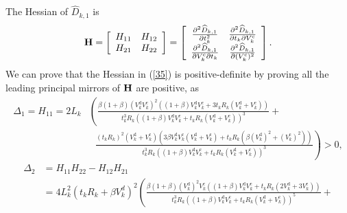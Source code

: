 \documentclass[journal,draftcls,onecolumn,12pt,twoside]{IEEEtran}
\begin{document}
\begin{appendices}
The Hessian of $\widehat{D}_{k,1}$ is
\begin{equation}
    \bf{H}=
    \left[
        \begin{array}{c c}
            H_{11}	&H_{12}\\
            H_{21}	&H_{22}
        \end{array}
    \right]=
    \left[
        \begin{array}{c c}
        \frac{\partial^2  \widehat{D}_{k,1}}{\partial t_k^2}	                    &\frac{\partial^2  \widehat{D}_{k,1}}{\partial t_k\partial V_k^{\text{c}}}\\
        \frac{\partial^2  \widehat{D}_{k,1}}{\partial V_k^{\text{c}} \partial t_k}	&\frac{\partial^2  \widehat{D}_{k,1}}{\partial(V_k^{\text{c}})^2}
        \end{array}
    \right]. \label{35}
\end{equation}
We can prove that the Hessian in (\ref{35}) is positive-definite by proving all the leading principal mirrors of $\bf{H}$ are positive, as
\begin{equation}
    \begin{aligned}
	\Delta_1=H_{11} = 2L_k
    & \left( \frac{ \beta (1+\beta)\left(V_k^{\text{d}} V_k^{\text{c}}\right)^2 \left( (1+\beta) V_k^{\text{d}} V_k^{\text{c}} + 3 t_k R_k \left( V_k^{\text{d}}+V_k^{\text{c}}
      \right)\right)}{t_k^3 R_k\left(\left(1+\beta\right)V_k^{\text{d}}V_k^{\text{c}} + t_k R_k \left(V_k^{\text{d}}+V_k^{\text{c}}\right)\right)^3}+\right.\\
    &~~~\left.\frac{ \left(t_k R_k\right)^2 \left( V_k^{\text{d}} + V_k^{\text{c}} \right) \left( 3\beta V_k^{\text{d}} V_k^{\text{c}} \left( V_k^{\text{d}} + V_k^{\text{c}}\right) + t_k R_k \left(\beta
        \left(V_k^{\text{d}}\right)^2+ \left(V_k^{\text{c}}\right)^2 \right) \right)} {t_k^3 R_k\left(\left(1+\beta\right)V_k^{\text{d}}V_k^{\text{c}} + t_k R_k \left(V_k^{\text{d}}+V_k^{\text{c}}\right)\right)^3} \right)>0,
    \end{aligned} \label{36}
\end{equation}
\begin{equation}
	\begin{aligned}
	\Delta_2
    &= H_{11}H_{22}-H_{12}H_{21}\\
    &= 4L_k^2 \left( t_k R_k + \beta V^d_k \right)^2 \left( \frac{ \beta (1+\beta) \left(V_k^{\text{d}}\right)^2 V_k^{\text{c}} \left( (1+\beta) V_k^{\text{d}} V_k^{\text{c}} + t_k R_k  \left(
       2V_k^{\text{d}}+3V_k^{\text{c}}\right) \right)} {t_k^3 R_k \left( (1+\beta) V_k^{\text{d}} V_k^{\text{c}} + t_k R_k \left( V_k^{\text{d}} + V_k^{\text{c}}\right) \right)^5}+\right.\\

\end{aligned}
\end{equation}
\end{appendices}
\end{document}
